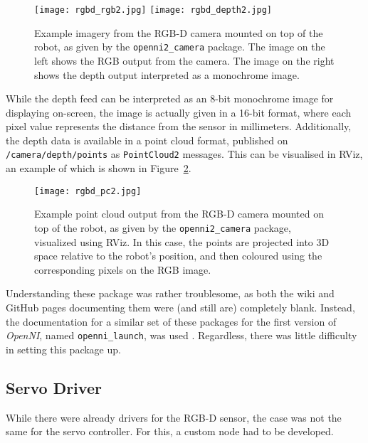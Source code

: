 \begin{figure}[h!]
    \centering
    \texttt{[image: rgbd\_rgb2.jpg]}
    \texttt{[image: rgbd\_depth2.jpg]}
    \caption{Example imagery from the RGB-D camera mounted on top of the robot, as given by the \texttt{openni2\_camera} package. The image on the left shows the RGB output from the camera. The image on the right shows the depth output interpreted as a monochrome image.}
    \label{fig:rgbd_images1}
\end{figure}

While the depth feed can be interpreted as an 8-bit monochrome image for displaying on-screen, the image is actually given in a 16-bit format, where each pixel value represents the distance from the sensor in millimeters. Additionally, the depth data is available in a point cloud format, published on \texttt{/camera/depth/points} as \texttt{PointCloud2} messages. This can be visualised in RViz, an example of which is shown in Figure~\ref{fig:rgbd_images2}.

\begin{figure}[h!]
    \centering
    \texttt{[image: rgbd\_pc2.jpg]}
    \caption{Example point cloud output from the RGB-D camera mounted on top of the robot, as given by the \texttt{openni2\_camera} package, visualized using RViz. In this case, the points are projected into 3D space relative to the robot's position, and then coloured using the corresponding pixels on the RGB image.}
    \label{fig:rgbd_images2}
\end{figure}

Understanding these package was rather troublesome, as both the wiki and GitHub pages documenting them were (and still are) completely blank. Instead, the documentation for a similar set of these packages for the first version of \emph{OpenNI}, named \texttt{openni\_launch}, was used \cite{ros_wiki_openni_launch}. Regardless, there was little difficulty in setting this package up.

\subsection{Servo Driver}

While there were already drivers for the RGB-D sensor, the case was not the same for the servo controller. For this, a custom node had to be developed.


